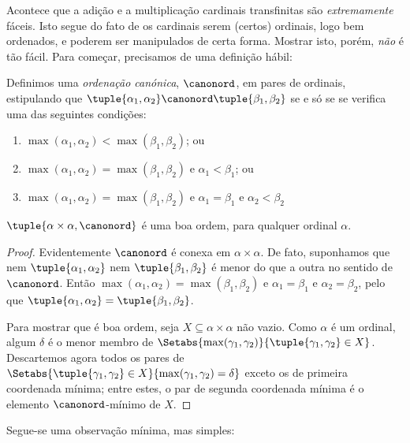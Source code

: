 \documentclass[../../../include/open-logic-section]{subfiles}
\begin{document}


Acontece que a adição e a multiplicação cardinais transfinitas são
\emph{extremamente} fáceis. Isto segue do fato de os cardinais serem
(certos) ordinais, logo bem ordenados, e poderem ser manipulados de
certa forma. Mostrar isto, porém, \emph{não} é tão fácil. Para começar,
precisamos de uma definição hábil:

\begin{defn}
Definimos uma \emph{ordenação canónica}, $\canonord$, em pares de
ordinais, estipulando que $\tuple{\alpha_1, \alpha_2} \canonord
\tuple{\beta_1, \beta_2}$ se e só se se verifica uma das seguintes condições:
\begin{enumerate}
	\item $\max(\alpha_1, \alpha_2) < \max(\beta_1, \beta_2)$; ou
	\item $\max(\alpha_1, \alpha_2) = \max(\beta_1, \beta_2)$ e
	$\alpha_1 < \beta_1$; ou
	\item $\max(\alpha_1, \alpha_2) = \max(\beta_1, \beta_2)$ e
	$\alpha_1 = \beta_1$ e $\alpha_2 < \beta_2$
\end{enumerate}
\end{defn}

\begin{lem}
$\tuple{\alpha \times \alpha, \canonord}$ é uma boa ordem, para qualquer
ordinal $\alpha$.
\end{lem}

\begin{proof}
Evidentemente $\canonord$ é conexa em $\alpha \times \alpha$. De fato,
suponhamos que nem $\tuple{\alpha_1, \alpha_2}$ nem $\tuple{\beta_1,
\beta_2}$ é menor do que a outra no sentido de $\canonord$. Então $\max(\alpha_1,
\alpha_2) = \max(\beta_1, \beta_2)$ e $\alpha_1 = \beta_1$ e
$\alpha_2 = \beta_2$, pelo que $\tuple{\alpha_1, \alpha_2} =
\tuple{\beta_1,  \beta_2}$.

Para mostrar que é boa ordem, seja $X \subseteq \alpha\times\alpha$ não
vazio. Como $\alpha$ é um ordinal, algum $\delta$ é o menor
membro de $\Setabs{\max(\gamma_1, \gamma_2)}{\tuple{\gamma_1,
\gamma_2} \in X}$. Descartemos agora todos os pares de
$\Setabs{\tuple{\gamma_1,\gamma_2} \in X}{\max(\gamma_1, \gamma_2) =
\delta}$ exceto os de primeira coordenada mínima; entre estes,
o par de segunda coordenada mínima é o elemento $\canonord$-mínimo
de $X$.
\end{proof}
\noindent
Segue-se uma observação mínima, mas simples:
\end{document}
